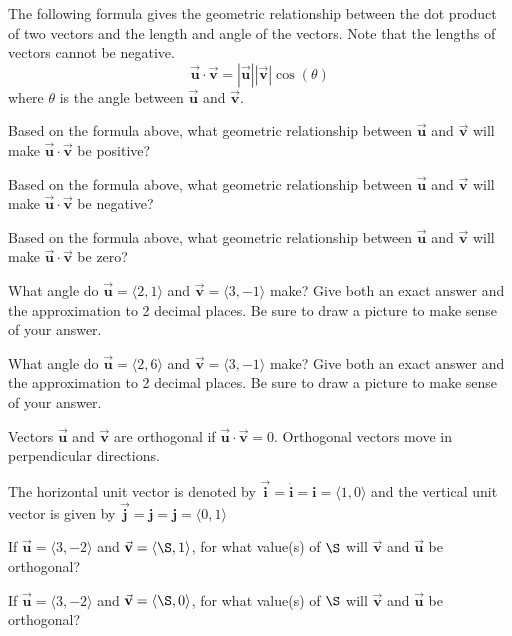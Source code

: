 \begin{info} The following formula gives the geometric relationship between the dot product of two vectors and the length and angle of the vectors. Note that the lengths of vectors cannot be negative. $$\vec{\textbf{u}} \cdot \vec{\textbf{v}}= |\vec{\textbf{u}}| | \vec{\textbf{v}}| \cos(\theta)$$
where $\theta$ is the angle between $\vec{\textbf{u}}$ and $\vec{\textbf{v}}$.
\end{info}

\bq \be
\item Based on the formula above, what geometric relationship between $\vec{\textbf{u}}$ and $\vec{\textbf{v}}$ will make $\vec{\textbf{u}} \cdot \vec{\textbf{v}}$ be positive?
\item Based on the formula above, what geometric relationship between $\vec{\textbf{u}}$ and $\vec{\textbf{v}}$ will make $\vec{\textbf{u}} \cdot \vec{\textbf{v}}$ be negative?
\item Based on the formula above, what geometric relationship between $\vec{\textbf{u}}$ and $\vec{\textbf{v}}$ will make $\vec{\textbf{u}} \cdot \vec{\textbf{v}}$ be zero?
\ee \eq

\bq What angle do $\vec{\textbf{u}}=\langle 2,1\rangle$ and $\vec{\textbf{v}}=\langle 3,-1\rangle$ make? Give both an exact answer and the approximation to 2 decimal places. Be sure to draw a picture to make sense of your answer.
\eq

\bq What angle do $\vec{\textbf{u}}=\langle 2,6\rangle$ and $\vec{\textbf{v}}=\langle 3,-1\rangle$ make? Give both an exact answer and the approximation to 2 decimal places. Be sure to draw a picture to make sense of your answer.
\eq
\begin{info} Vectors $\vec{\textbf{u}}$ and $\vec{\textbf{v}}$ are orthogonal if $\vec{\textbf{u}} \cdot \vec{\textbf{v}}= 0$. Orthogonal vectors move in perpendicular directions.

The horizontal unit vector is denoted by $\vec{\textbf{i}}= \hat{\textbf{i}}= \textbf{i}= \langle 1,0\rangle$ and the vertical unit vector is given by $\vec{\textbf{j}}= \hat{\textbf{j}}= \textbf{j}=\langle 0,1\rangle$
\end{info}

\bq If $\vec{\textbf{u}}=\langle 3,-2\rangle$ and $\vec{\textbf{v}}=\langle \S,1\rangle$, for what value(s) of $\S$ will $\vec{\textbf{v}}$ and $\vec{\textbf{u}}$ be orthogonal?
\eq

\bq If $\vec{\textbf{u}}=\langle 3,-2\rangle$ and $\vec{\textbf{v}}=\langle \S,0\rangle$, for what value(s) of $\S$ will $\vec{\textbf{v}}$ and $\vec{\textbf{u}}$ be orthogonal?
\eq

